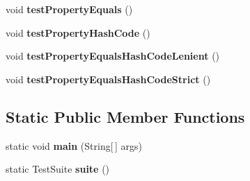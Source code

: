 \begin{DoxyCompactItemize}
\item 
\hypertarget{classorg_1_1joda_1_1time_1_1_test_year_month___properties_a542fac74bb99a30035ee8e2b2805223f}{void {\bfseries test\-Property\-Equals} ()}\label{classorg_1_1joda_1_1time_1_1_test_year_month___properties_a542fac74bb99a30035ee8e2b2805223f}

\item 
\hypertarget{classorg_1_1joda_1_1time_1_1_test_year_month___properties_a4d42970d278c5aec2e67b80fee4a2d43}{void {\bfseries test\-Property\-Hash\-Code} ()}\label{classorg_1_1joda_1_1time_1_1_test_year_month___properties_a4d42970d278c5aec2e67b80fee4a2d43}

\item 
\hypertarget{classorg_1_1joda_1_1time_1_1_test_year_month___properties_aea00d19b5fd983c01d0c0b0da95348e2}{void {\bfseries test\-Property\-Equals\-Hash\-Code\-Lenient} ()}\label{classorg_1_1joda_1_1time_1_1_test_year_month___properties_aea00d19b5fd983c01d0c0b0da95348e2}

\item 
\hypertarget{classorg_1_1joda_1_1time_1_1_test_year_month___properties_adf2a100c6e86669dff22907fd36329f5}{void {\bfseries test\-Property\-Equals\-Hash\-Code\-Strict} ()}\label{classorg_1_1joda_1_1time_1_1_test_year_month___properties_adf2a100c6e86669dff22907fd36329f5}

\end{DoxyCompactItemize}
\subsection*{Static Public Member Functions}
\begin{DoxyCompactItemize}
\item 
\hypertarget{classorg_1_1joda_1_1time_1_1_test_year_month___properties_a36de92df49b6f6d28267e030610d4bd2}{static void {\bfseries main} (String\mbox{[}$\,$\mbox{]} args)}\label{classorg_1_1joda_1_1time_1_1_test_year_month___properties_a36de92df49b6f6d28267e030610d4bd2}

\item 
\hypertarget{classorg_1_1joda_1_1time_1_1_test_year_month___properties_ab018762a73469f03003e095eccbfd88c}{static Test\-Suite {\bfseries suite} ()}\label{classorg_1_1joda_1_1time_1_1_test_year_month___properties_ab018762a73469f03003e095eccbfd88c}

\end{DoxyCompactItemize}
